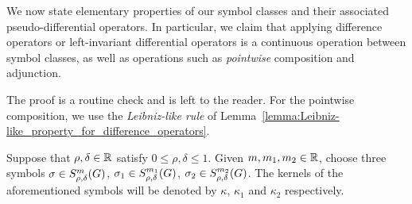 We now state elementary properties of our symbol classes and their associated pseudo-differential operators.
In particular,
we claim that applying difference operators or left-invariant differential operators is a continuous operation between symbol classes,
as well as operations such as \emph{pointwise} composition and adjunction.

The proof is a routine check and is left to the reader.
For the pointwise composition,
we use the \emph{Leibniz-like rule} of Lemma~\ref{lemma:Leibniz-like_property_for_difference_operators}.

\begin{proposition}
\label{proposition:first_properties_of_symbol_classes}
    Suppose that $\rho, \delta \in \mathbb{R}$ satisfy $0 \leq \rho, \delta \leq 1$.
    Given $m, m_1, m_2 \in \mathbb{R}$,
    choose three symbols $\sigma \in S^{m}_{\rho, \delta}(G)$,
    $\sigma_1 \in S^{m_1}_{\rho, \delta}(G)$,
    $\sigma_2 \in S^{m_2}_{\rho, \delta}(G)$.
    The kernels of the aforementioned symbols will be denoted by
    $\kappa$, $\kappa_1$ and $\kappa_2$ respectively.


\end{proposition}
